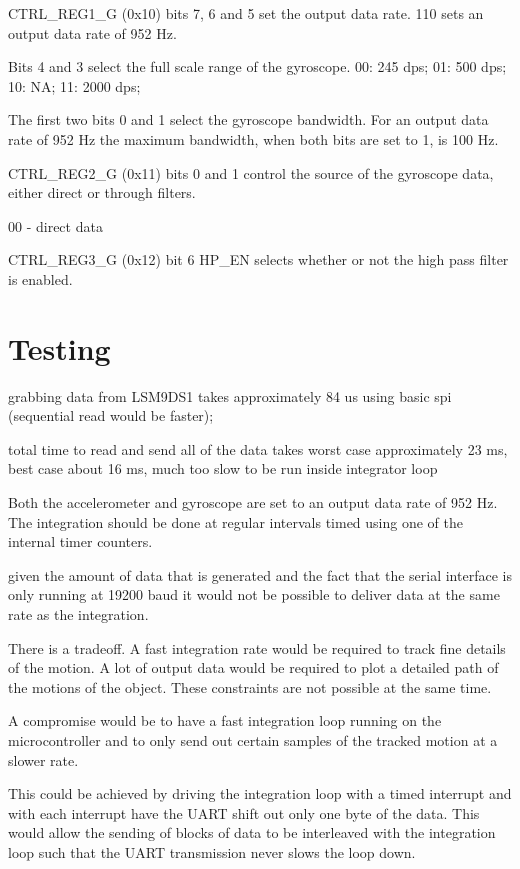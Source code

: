 \documentclass[10pt, a4paper]{article}
\def\vs{\vspace{6pt}}
\begin{document}
CTRL\_REG1\_G (0x10) bits 7, 6 and 5 set the output data rate. 110 sets an output data rate of 952 Hz.

Bits 4 and 3 select the full scale range of the gyroscope. 00: 245 dps; 01: 500 dps; 10: NA; 11: 2000 dps;

The first two bits 0 and 1 select the gyroscope bandwidth. For an output data rate of 952 Hz the maximum bandwidth, when both bits are set to 1, is 100 Hz.

CTRL\_REG2\_G (0x11) bits 0 and 1 control the source of the gyroscope data, either direct or through filters.

00 - direct data

CTRL\_REG3\_G (0x12) bit 6 HP\_EN selects whether or not the high pass filter is enabled.

\section{Testing}

grabbing data from LSM9DS1 takes approximately 84 us using basic spi (sequential read would be faster);

\vs
total time to read and send all of the data takes worst case approximately 23 ms, best case about 16 ms, much too slow to be run inside integrator loop

\vs
Both the accelerometer and gyroscope are set to an output data rate of 952 Hz. The integration should be done at regular intervals timed using one of the internal timer counters.

\vs
given the amount of data that is generated and the fact that the serial interface is only running at 19200 baud it would not be possible to deliver data at the same rate as the integration.

\vs
There is a tradeoff. A fast integration rate would be required to track fine details of the motion. A lot of output data would be required to plot a detailed path of the motions of the object. These constraints are not possible at the same time.

\vs
A compromise would be to have a fast integration loop running on the microcontroller and to only send out certain samples of the tracked motion at a slower rate.

\vs
This could be achieved by driving the integration loop with a timed interrupt and with each interrupt have the UART shift out only one byte of the data. This would allow the sending of blocks of data to be interleaved with the integration loop such that the UART transmission never slows the loop down.
\end{document}
